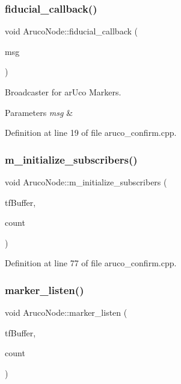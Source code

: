 \subsubsection{\texorpdfstring{fiducial\+\_\+callback()}{fiducial\_callback()}}
{\footnotesize\ttfamily void Aruco\+Node\+::fiducial\+\_\+callback (\begin{DoxyParamCaption}\item[{const fiducial\+\_\+msgs\+::\+Fiducial\+Transform\+Array\+::\+Const\+Ptr \&}]{msg }\end{DoxyParamCaption})}



Broadcaster for ar\+Uco Markers. 


\begin{DoxyParams}{Parameters}
{\em msg} & \\
\hline
\end{DoxyParams}


Definition at line 19 of file aruco\+\_\+confirm.\+cpp.

\mbox{\label{class_aruco_node_a986dfcf96c1b6688571e85b181d011e0}} 
\subsubsection{\texorpdfstring{m\+\_\+initialize\+\_\+subscribers()}{m\_initialize\_subscribers()}}
{\footnotesize\ttfamily void Aruco\+Node\+::m\+\_\+initialize\+\_\+subscribers (\begin{DoxyParamCaption}\item[{tf2\+\_\+ros\+::\+Buffer \&}]{tf\+Buffer,  }\item[{int}]{count }\end{DoxyParamCaption})}



Definition at line 77 of file aruco\+\_\+confirm.\+cpp.

\mbox{\label{class_aruco_node_ad79fd951057c9a40f34fc159363fbd94}} 
\subsubsection{\texorpdfstring{marker\+\_\+listen()}{marker\_listen()}}
{\footnotesize\ttfamily void Aruco\+Node\+::marker\+\_\+listen (\begin{DoxyParamCaption}\item[{tf2\+\_\+ros\+::\+Buffer \&}]{tf\+Buffer,  }\item[{int}]{count }\end{DoxyParamCaption})}



